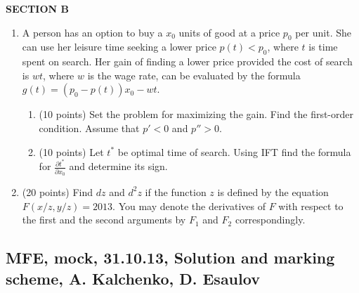 \textbf{SECTION B}

\begin{enumerate}[resume]
\item A person has an option to buy a $x_0$ units of good at a price $p_0$ per unit. She can use her leisure time seeking a lower price $p(t)<p_0$, where $t$ is time spent on search. Her gain of finding a lower price provided the cost of search is $wt$, where $w$ is the wage rate, can be evaluated by the formula $g(t)=(p_0-p(t))x_0-wt$.
\begin{enumerate}
\item (10 points) Set the problem for maximizing the gain. Find the first-order condition. Assume that  $p'<0$ and $p''>0$.
\item (10 points) Let $t^*$ be optimal time of search. Using IFT find the formula for $\frac{\partial t^*}{\partial x_0}$ and determine its sign.
\end{enumerate}

\item (20 points) Find $dz$ and $d^2z$ if the function $z$ is defined by the equation $F(x/z,y/z)=2013$. You may denote the derivatives of $F$ with respect to the first and the second arguments by $F_1$ and $F_2$ correspondingly.



\end{enumerate}



\subsection{MFE, mock, 31.10.13, Solution and marking scheme, A. Kalchenko, D. Esaulov}


